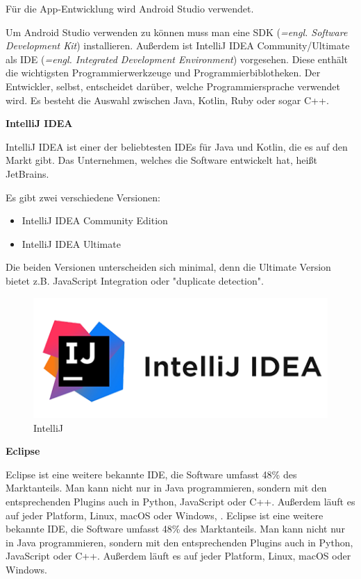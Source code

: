 Für die App-Entwicklung wird Android Studio verwendet. 

Um Android Studio verwenden zu können muss man eine SDK (\emph{=engl. Software Development Kit}) installieren. \textcite{AppEntwicklung} Außerdem ist IntelliJ IDEA Community/Ultimate als IDE (\emph{=engl. Integrated Development Environment}) vorgesehen. Diese enthält die wichtigsten Programmierwerkzeuge und Programmierbiblotheken. Der Entwickler, selbst, entscheidet darüber, welche Programmiersprache verwendet wird. Es besteht die Auswahl zwischen Java, Kotlin, Ruby oder sogar C++.


\textbf{IntelliJ IDEA}

IntelliJ IDEA ist einer der beliebtesten IDEs für Java und Kotlin, die es auf den Markt gibt. Das Unternehmen, welches die Software entwickelt hat, heißt JetBrains. 

Es gibt zwei verschiedene Versionen:
\begin{itemize}
	\item IntelliJ IDEA Community Edition
	\item IntelliJ IDEA Ultimate
\end{itemize}

Die beiden Versionen unterscheiden sich minimal, denn die Ultimate Version bietet z.B. JavaScript Integration oder "duplicate detection". \textcite{IntelliJ}

\begin{figure}[H]
	\centering
	\includegraphics[width=0.5\linewidth]{images/intelliJ.png}
	\caption[IntelliJ]{IntelliJ}
	\label{fig:IntelliJ}
\end{figure}

\textbf{Eclipse}

Eclipse ist eine weitere bekannte IDE, die Software umfasst 48\% des Marktanteils. Man kann nicht nur in Java programmieren, sondern mit den entsprechenden Plugins auch in Python, JavaScript oder C++. Außerdem läuft es auf jeder Platform, Linux, macOS oder Windows, \textcite{Eclipse}.
Eclipse ist eine weitere bekannte IDE, die Software umfasst 48\% des Marktanteils. Man kann nicht nur in Java programmieren, sondern mit den entsprechenden Plugins auch in Python, JavaScript oder C++. Außerdem läuft es auf jeder Platform, Linux, macOS oder Windows.

